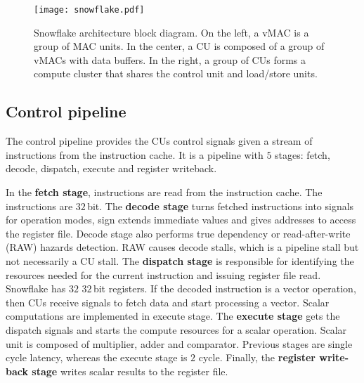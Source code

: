 \documentclass{sig-alternate}
\begin{document}
\begin{figure*}
\centering
  \texttt{[image: snowflake.pdf]}
  \caption{Snowflake architecture block diagram. On the left, a vMAC is a group of MAC units. In the center, a CU is composed of a group of vMACs with data buffers. In the right, a group of CUs forms a compute cluster that shares the control unit and load/store units.}
  \label{fig:snowflake}
\end{figure*}

\subsection{Control pipeline}
The control pipeline provides the CUs control signals given a stream of instructions from the instruction cache. It is a pipeline with $5$ stages: fetch, decode, dispatch, execute and register writeback.

In the \textbf{fetch stage}, instructions are read from the instruction cache. The instructions are $32$\,bit. The \textbf{decode stage} turns fetched instructions into signals for operation modes, sign extends immediate values and gives addresses to access the register file. Decode stage also performs true dependency or read-after-write (RAW) hazards detection. RAW causes decode stalls, which is a pipeline stall but not necessarily a CU stall. The \textbf{dispatch stage} is responsible for identifying the resources needed for the current instruction and issuing register file read. Snowflake has $32$ $32$\,bit registers. If the decoded instruction is a vector operation, then CUs receive signals to fetch data and start processing a vector. Scalar computations are implemented in execute stage. The \textbf{execute stage} gets the dispatch signals and starts the compute resources for a scalar operation. Scalar unit is composed of multiplier, adder and comparator. Previous stages are single cycle latency, whereas the execute stage is $2$ cycle. Finally, the \textbf{register write-back stage} writes scalar results to the register file.


\end{document}
